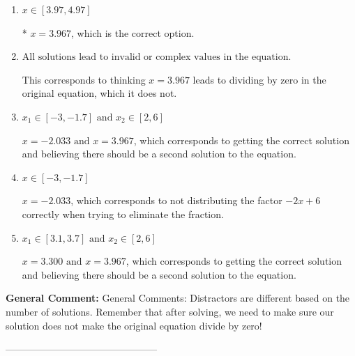 \documentclass{extbook}[14pt]
\begin{document}
\begin{enumerate}[label=\Alph*.] 
\item $ x \in [3.97,4.97] $ 

 * $x = 3.967$, which is the correct option. 
\item $ \text{All solutions lead to invalid or complex values in the equation.} $ 

 This corresponds to thinking $x = 3.967$ leads to dividing by zero in the original equation, which it does not. 
\item $ x_1 \in [-3, -1.7] \text{ and } x_2 \in [2,6] $ 

 $x = -2.033 \text{ and } x = 3.967$, which corresponds to getting the correct solution and believing there should be a second solution to the equation. 
\item $ x \in [-3,-1.7] $ 

 $x = -2.033$, which corresponds to not distributing the factor $-2x + 6$ correctly when trying to eliminate the fraction. 
\item $ x_1 \in [3.1, 3.7] \text{ and } x_2 \in [2,6] $ 

 $x = 3.300 \text{ and } x = 3.967$, which corresponds to getting the correct solution and believing there should be a second solution to the equation. 
\end{enumerate} 
 
\textbf{General Comment:} General Comments: Distractors are different based on the number of solutions. Remember that after solving, we need to make sure our solution does not make the original equation divide by zero! 

-----------------------------------------------
\end{document}
